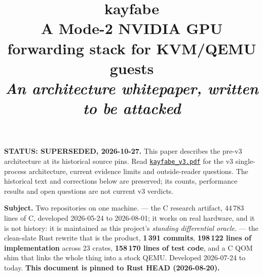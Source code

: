 \documentclass[10.5pt]{article}
\title{\vspace{-1.2cm}\sffamily\bfseries kayfabe\\[2mm]
  \large\mdseries A Mode-2 NVIDIA GPU forwarding stack for KVM/QEMU guests\\[1mm]
  \normalsize\itshape An architecture whitepaper, written to be attacked}
\author{}
\date{}
\begin{document}
\maketitle
\vspace{-1.4cm}

\begin{warnbox}
\textbf{STATUS: SUPERSEDED, 2026-10-27.} This paper describes the pre-v3 architecture at its
historical source pins. Read \href{kayfabe_v3.pdf}{\texttt{kayfabe\_v3.pdf}} for the v3
single-process architecture, current evidence limits and outside-reader questions.
The historical text and corrections below are preserved; its counts, performance results
and open questions are not current v3 verdicts.
\end{warnbox}

\begin{claimbox}
\small
\textbf{Subject.} Two repositories on one machine.  —
the C research artifact, 44\,783 lines of C, developed 2026-05-24 to 2026-08-01; it works on real
hardware, and it is not history: it is maintained as this project's \emph{standing differential
oracle}.  — the clean-slate Rust rewrite that is the product, \textbf{1\,391
commits}, \textbf{198\,122 lines of implementation} across 23 crates, \textbf{158\,170 lines of
test code}, and a C QOM shim that links the whole thing into a stock QEMU. Developed 2026-07-24 to
today. \textbf{This document is pinned to Rust HEAD  (2026-08-20).}


\end{claimbox}
\end{document}
